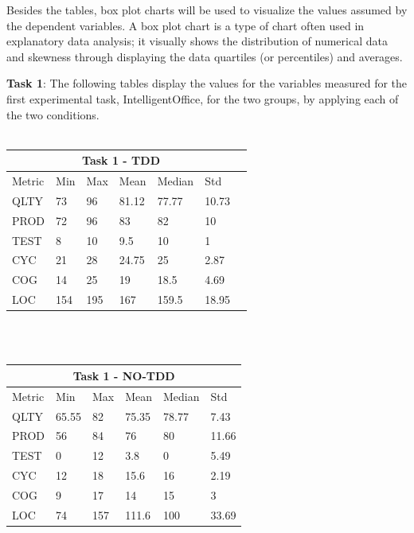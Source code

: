 Besides the tables, box plot charts will be used to visualize the values assumed by the dependent variables.
A box plot chart is a type of chart often used in explanatory data analysis; it visually shows the distribution of numerical data and skewness through displaying the data quartiles (or percentiles) and averages.


\noindent\textbf{Task 1}: The following tables display the values for the variables measured for the first experimental task, IntelligentOffice, for the two groups, by applying each of the two conditions.
\\ \  \\
\noindent
\begin{tabular}{ |p{2cm}||p{1.6cm}|p{1.6cm}|p{1.6cm}|p{1.6cm}|p{1.6cm}|p{1.6cm}| }
    \hline
        \multicolumn{6}{|c|}{Task 1 - TDD} \\
    \hline
        Metric & Min & Max & Mean & Median & Std \\
    \hline
        QLTY & 73 & 96 & 81.12 & 77.77 & 10.73 \\
        PROD & 72 & 96 & 83 & 82 & 10 \\
        TEST & 8 & 10 & 9.5 & 10 & 1 \\
        CYC & 21 & 28 & 24.75 & 25 & 2.87 \\
        COG & 14 & 25 & 19 & 18.5 & 4.69 \\
        LOC & 154 & 195 & 167 & 159.5 & 18.95 \\
    \hline
\end{tabular}
\\ \  \\
\noindent
\begin{tabular}{ |p{2cm}||p{1.6cm}|p{1.6cm}|p{1.6cm}|p{1.6cm}|p{1.6cm}|}
    \hline
        \multicolumn{6}{|c|}{Task 1 - NO-TDD} \\
    \hline
        Metric & Min & Max & Mean & Median & Std\\
    \hline
        QLTY & 65.55 & 82 & 75.35 & 78.77 & 7.43 \\
        PROD & 56 & 84 & 76 & 80 & 11.66 \\
        TEST & 0 & 12 & 3.8 & 0 & 5.49 \\
        CYC & 12 & 18 & 15.6 & 16 & 2.19 \\
        COG & 9 & 17 & 14 & 15 & 3 \\
        LOC & 74 & 157 & 111.6 & 100 & 33.69 \\
    \hline
\end{tabular}
\\ \  \\
